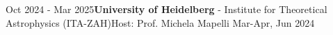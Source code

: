 %
%
%
\begin{experiences}
  \visiting
    {Oct 2024 - Mar 2025}{\textbf{University of Heidelberg} - Institute for Theoretical Astrophysics (ITA-ZAH)}{Host: Prof. Michela Mapelli }
    {Mar-Apr, Jun 2024}
\end{experiences}
